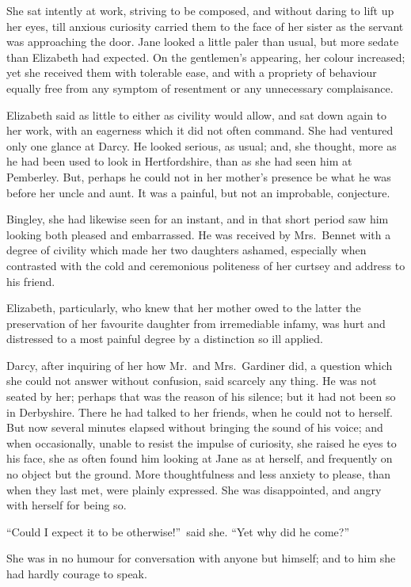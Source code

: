 \documentclass[12pt,english,oneside]{book}
\begin{document}
She sat intently at work, striving to be composed, and without daring
to lift up her eyes, till anxious curiosity carried them to the face
of her sister as the servant was approaching the door. Jane looked
a little paler than usual, but more sedate than Elizabeth had expected.
On the gentlemen's appearing, her colour increased; yet she received
them with tolerable ease, and with a propriety of behaviour equally
free from any symptom of resentment or any unnecessary complaisance.

Elizabeth said as little to either as civility would allow, and sat
down again to her work, with an eagerness which it did not often command.
She had ventured only one glance at Darcy. He looked serious, as usual;
and, she thought, more as he had been used to look in Hertfordshire,
than as she had seen him at Pemberley. But, perhaps he could not in
her mother's presence be what he was before her uncle and aunt. It
was a painful, but not an improbable, conjecture.

Bingley, she had likewise seen for an instant, and in that short period
saw him looking both pleased and embarrassed. He was received by Mrs.\ Bennet
with a degree of civility which made her two daughters ashamed, especially
when contrasted with the cold and ceremonious politeness of her curtsey
and address to his friend.

Elizabeth, particularly, who knew that her mother owed to the latter
the preservation of her favourite daughter from irremediable infamy,
was hurt and distressed to a most painful degree by a distinction
so ill applied.

Darcy, after inquiring of her how Mr.\ and Mrs.\ Gardiner did, a
question which she could not answer without confusion, said scarcely
any thing. He was not seated by her; perhaps that was the reason of
his silence; but it had not been so in Derbyshire. There he had talked
to her friends, when he could not to herself. But now several minutes
elapsed without bringing the sound of his voice; and when occasionally,
unable to resist the impulse of curiosity, she raised he eyes to his
face, she as often found him looking at Jane as at herself, and frequently
on no object but the ground. More thoughtfulness and less anxiety
to please, than when they last met, were plainly expressed. She was
disappointed, and angry with herself for being so.

{}``Could I expect it to be otherwise!''\ said she. {}``Yet why
did he come?''\ 

She was in no humour for conversation with anyone but himself; and
to him she had hardly courage to speak.
\end{document}
